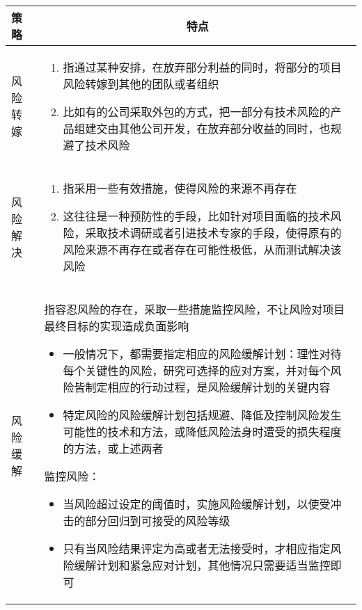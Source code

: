 \vspace{-0.5em}
\begin{spacing}{1.2}
    \centering
    \begin{longtable}{|m{2cm}<{\centering}|m{13cm}|}
        \hline
        \textbf{策略} & \multicolumn{1}{c|}{\textbf{特点}} \\ \hline
        风险转嫁 &
        \vspace{-1.1em}
        \begin{enumerate}[label=,leftmargin=0em]
            \item 指通过某种安排，在放弃部分利益的同时，将部分的项目风险转嫁到其他的团队或者组织
            \item 比如有的公司采取外包的方式，把一部分有技术风险的产品组建交由其他公司开发，在放弃部分收益的同时，也规避了技术风险
            \vspace{-1.1em}
        \end{enumerate}
        \\ \hline
        风险解决 &
        \vspace{-1.1em}
        \begin{enumerate}[label=,leftmargin=0em]
            \item 指采用一些有效措施，使得风险的来源不再存在
            \item 这往往是一种预防性的手段，比如针对项目面临的技术风险，采取技术调研或者引进技术专家的手段，使得原有的风险来源不再存在或者存在可能性极低，从而测试解决该风险
            \vspace{-1.1em}
        \end{enumerate}
        \\ \hline
        风险缓解 &
        指容忍风险的存在，采取一些措施监控风险，不让风险对项目最终目标的实现造成负面影响
        \begin{itemize}
            \item 一般情况下，都需要指定相应的风险缓解计划：理性对待每个关键性的风险，研究可选择的应对方案，并对每个风险皆制定相应的行动过程，是风险缓解计划的关键内容
            \item 特定风险的风险缓解计划包括规避、降低及控制风险发生可能性的技术和方法，或降低风险法身时遭受的损失程度的方法，或上述两者
            \vspace{0.25em}
        \end{itemize}
        监控风险：
        \begin{itemize}
            \item 当风险超过设定的阈值时，实施风险缓解计划，以使受冲击的部分回归到可接受的风险等级
            \item 只有当风险结果评定为高或者无法接受时，才相应指定风险缓解计划和紧急应对计划，其他情况只需要适当监控即可
            \vspace{-1.1em}
        \end{itemize}
        \\ \hline
    \end{longtable}
\end{spacing}
\vspace{-1em}
